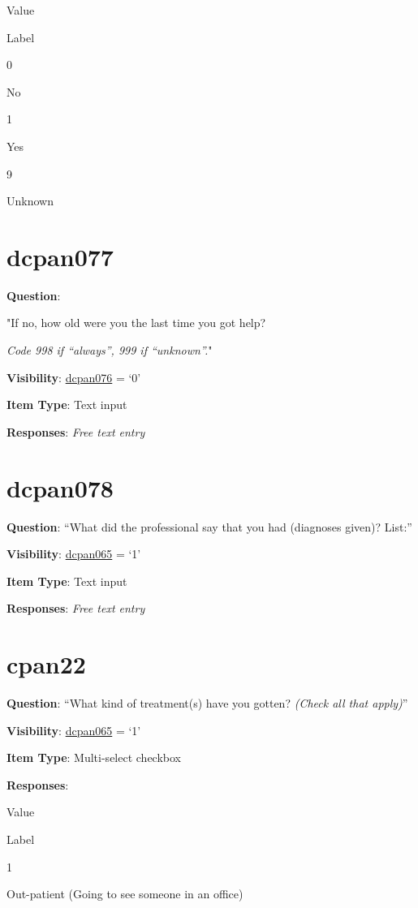 \documentclass[]{book}
\begin{document}
Value

Label

0

No

1

Yes

9

Unknown

\hypertarget{dcpan077}{%
\section{dcpan077}\label{dcpan077}}

\textbf{Question}:

"If no, how old were you the last time you got help?

\emph{Code 998 if ``always'', 999 if ``unknown''.}"

\textbf{Visibility}: \protect\hyperlink{dcpan076}{dcpan076} = `0'

\textbf{Item Type}: Text input

\textbf{Responses}: \emph{Free text entry}

\hypertarget{dcpan078}{%
\section{dcpan078}\label{dcpan078}}

\textbf{Question}: ``What did the professional say that you had (diagnoses given)? List:''

\textbf{Visibility}: \protect\hyperlink{dcpan065}{dcpan065} = `1'

\textbf{Item Type}: Text input

\textbf{Responses}: \emph{Free text entry}

\hypertarget{cpan22}{%
\section{cpan22}\label{cpan22}}

\textbf{Question}: ``What kind of treatment(s) have you gotten? \emph{(Check all that apply)}''

\textbf{Visibility}: \protect\hyperlink{dcpan065}{dcpan065} = `1'

\textbf{Item Type}: Multi-select checkbox

\textbf{Responses}:

Value

Label

1

Out-patient (Going to see someone in an office)
\end{document}
